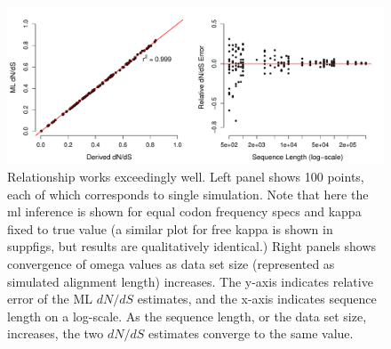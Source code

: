 \documentclass[11pt]{article}
\begin{document}

	
\newpage

	

\begin{figure}[H]
\centerline{\includegraphics[width=6in]{figures/regression_convergence.pdf}}
\caption{\label{reg_conv} Relationship works exceedingly well. Left panel shows 100 points, each of which corresponds to single simulation. Note that here the ml inference is shown for equal codon frequency specs and kappa fixed to true value (a similar plot for free kappa is shown in suppfigs, but results are qualitatively identical.) Right panels shows convergence of omega values as data set size (represented as simulated alignment length) increases. The y-axis indicates relative error of the ML $dN/dS$ estimates, and the x-axis indicates sequence length on a log-scale. As the sequence length, or the data set size, increases, the two $dN/dS$ estimates converge to the same value. }
\end{figure}
\end{document}
